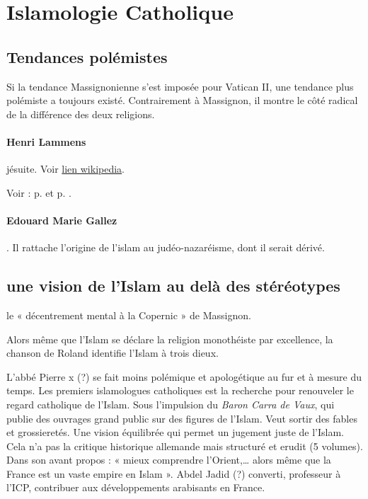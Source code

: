 
\section{Islamologie Catholique}


\subsection{Tendances polémistes}
Si la tendance Massignonienne s’est imposée pour Vatican II, une tendance plus polémiste a toujours existé. Contrairement à Massignon, il montre le côté radical de la différence des deux religions.  
\paragraph{Henri Lammens} jésuite. Voir \href{https://fr.wikipedia.org/wiki/Henri_Lammens}{lien wikipedia}.

Voir : p. \pageref{Theol:Lammens2} et p. \pageref{Lammens1}.
\paragraph{Edouard Marie Gallez}. Il rattache l'origine de l'islam au judéo-nazaréisme, dont il serait dérivé.

\subsection{une vision de l’Islam au delà des stéréotypes}

 le  « décentrement mental à la Copernic » de Massignon. 
\begin{Ex}
Alors même que l’Islam se déclare la religion monothéiste par excellence, la chanson de Roland identifie l’Islam à trois dieux. 
\end{Ex}
L’abbé Pierre x (?) se fait moins polémique et apologétique au fur et à mesure du temps. Les premiers islamologues catholiques est la recherche pour renouveler le regard catholique de l’Islam. Sous l’impulsion du \emph{ Baron Carra de Vaux}, qui publie des ouvrages grand public sur des figures de l’Islam. Veut sortir des fables et grossieretés. Une vision équilibrée qui permet un jugement juste de l’Islam. Cela n’a pas la critique historique allemande mais structuré et erudit (5 volumes).  Dans son avant propos : « mieux comprendre l’Orient,… alors même que la France est un vaste empire en Islam ».  Abdel Jadid (?) converti, professeur à l’ICP, contribuer aux développements arabisants en France. 

